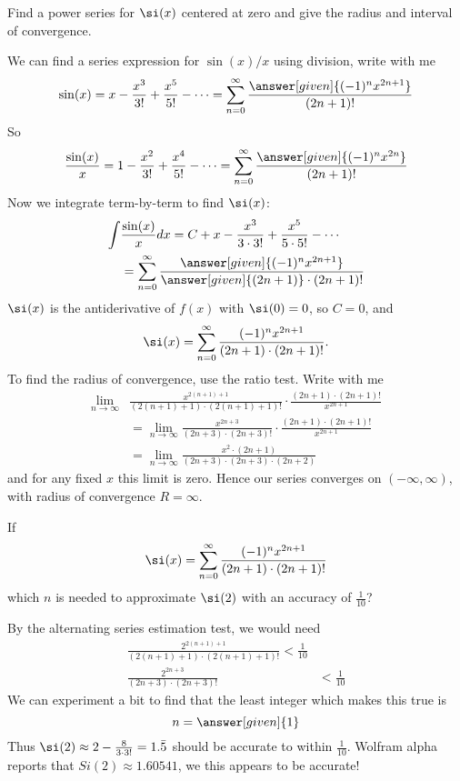 \documentclass{ximera}
\begin{document}
\begin{example}
  Find a power series for $\si(x)$ centered at zero and give the
  radius and interval of convergence.
\begin{explanation}
  We can find a series expression for $\sin(x)/x$ using division, write with me
  \[
  \sin(x) = x-\frac{x^3}{3!}+\frac{x^5}{5!}-\dots = \sum_{n=0}^\infty \frac{\answer[given]{(-1)^n x^{2n+1}}}{(2n+1)!} 
  \]
  So 
  \[
  \frac{\sin(x)}{x} =1-\frac{x^2}{3!}+\frac{x^4}{5!}-\dots = \sum_{n=0}^\infty \frac{\answer[given]{(-1)^n x^{2n}}}{(2n+1)!} 
  \]
  Now we integrate term-by-term to find $\si(x)$:
  \begin{align*}
  \int &\frac{\sin(x)}{x} dx = C+x-\frac{x^3}{3 \cdot 3!}+\frac{x^5}{5 \cdot 5!}-\cdots \\
  &= \sum_{n=0}^\infty \frac{\answer[given]{(-1)^nx^{2n+1}}}{\answer[given]{(2n+1)} \cdot (2n+1)!} 
  \end{align*}
  $\si(x)$ is the antiderivative of $f(x)$ with $\si(0) = 0$, so  $C=0$, and 
  \[
  \si(x) = \sum_{n=0}^\infty \frac{(-1)^nx^{2n+1}}{(2n+1) \cdot (2n+1)!}.
  \]
  To find the radius of convergence, use the ratio test. Write with me
  \begin{align*}
    \lim_{n\to\infty} &\frac{x^{2(n+1)+1}}{(2(n+1)+1) \cdot (2(n+1)+1)!} \cdot \frac{(2n+1) \cdot (2n+1)!}{x^{2n+1}}\\
    &=\lim_{n\to\infty}\frac{x^{2n+3}}{(2n+3) \cdot (2n+3)!} \cdot \frac{(2n+1) \cdot (2n+1)!}{x^{2n+1}}\\
    &=\lim_{n\to\infty}\frac{x^{2}\cdot (2n+1)}{(2n+3) \cdot (2n+3)\cdot(2n+2)}
  \end{align*}
  and for any fixed $x$ this limit is zero. Hence our series converges
  on $(-\infty,\infty)$, with radius of convergence $R=\infty$.
 \end{explanation}
\end{example}


\begin{example}
  If
  \[
  \si(x) = \sum_{n=0}^\infty \frac{(-1)^n x^{2n+1}}{(2n+1) \cdot (2n+1)!} 
  \]
  which $n$ is needed to approximate $\si(2)$ with an accuracy
  of $\frac{1}{10}$?
  \begin{explanation}
    By the alternating series estimation test, we would need
    \begin{align*}
    \frac{2^{2(n+1)+1}}{(2(n+1)+1) \cdot (2(n+1)+1)!}  <  \frac{1}{10}\\
    \frac{ 2^{2n+3}}{(2n+3) \cdot (2n+3)!} &< \frac{1}{10}
    \end{align*}
    We can experiment a bit to find that the least integer which makes this true is 
    \[
    n= \answer[given]{1}
    \]
    Thus $\si(2) \approx 2-\frac{8}{3 \cdot 3!} = 1.\bar{5}$ should be
    accurate to within $\frac{1}{10}$.  Wolfram alpha reports that $Si(2)
    \approx 1.60541 $, we this appears to be accurate!
  \end{explanation}
\end{example}
\end{document}
